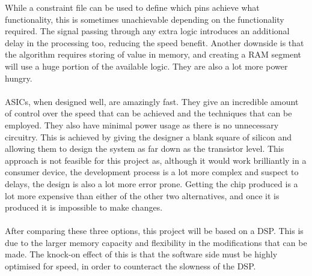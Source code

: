 While a constraint file can be used to define which pins achieve what functionality, this is sometimes unachievable depending on the functionality required.
The signal passing through any extra logic introduces an additional delay in the processing too, reducing the speed benefit.
Another downside is that the algorithm requires storing of value in memory, and creating a RAM segment will use a huge portion of the available logic.
They are also a lot more power hungry.
\\
\\
ASICs, when designed well, are amazingly fast.
They give an incredible amount of control over the speed that can be achieved and the techniques that can be employed.
They also have minimal power usage as there is no unnecessary circuitry.
This is achieved by giving the designer a blank square of silicon and allowing them to design the system as far down as the transistor level.
This approach is not feasible for this project as, although it would work brilliantly in a consumer device, the development process is a lot more complex and suspect to delays, the design is also a lot more error prone.
Getting the chip produced is a lot more expensive than either of the other two alternatives, and once it is produced it is impossible to make changes.
\\
\\
After comparing these three options, this project will be based on a DSP.
This is due to the larger memory capacity and flexibility in the modifications that can be made.
The knock-on effect of this is that the software side must be highly optimised for speed, in order to counteract the slowness of the DSP. 
